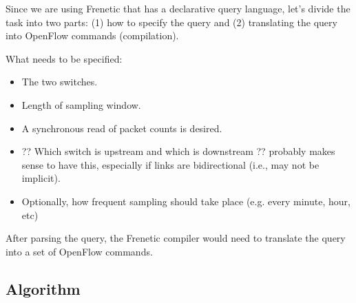 Since we are using Frenetic that has a declarative query language, let's divide the task into two parts: (1) how to specify the query and (2) translating the query into
OpenFlow commands (compilation).

What needs to be specified:
\begin{itemize}
	\item The two switches.
	\item Length of sampling window.
	\item A synchronous read of packet counts is desired.
	\item ?? Which switch is upstream and which is downstream ?? probably makes sense to have this, especially if links are bidirectional (i.e., may not be implicit).
	\item Optionally, how frequent sampling should take place (e.g. every minute, hour, etc)
\end{itemize}

After parsing the query, the Frenetic compiler would need to translate the query into a set of OpenFlow commands.







\subsection{\mf Algorithm}

%


